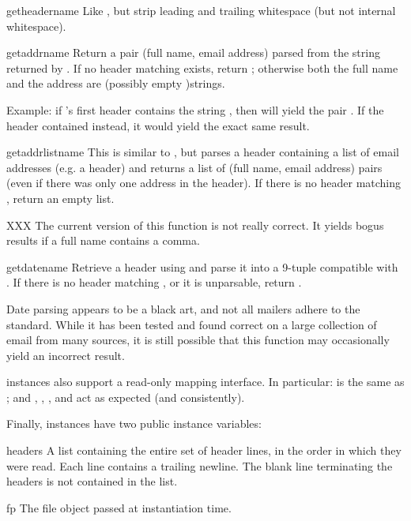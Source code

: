 \begin{funcdesc}{getheader}{name}
Like , but strip leading and trailing
whitespace (but not internal whitespace).
\end{funcdesc}

\begin{funcdesc}{getaddr}{name}
Return a pair (full name, email address) parsed from the string
returned by .  If no header matching
 exists, return ; otherwise both the full
name and the address are (possibly empty )strings.

Example: if 's first  header contains the string
, then
 will yield the pair
.
If the header contained
 instead, it would yield the
exact same result.
\end{funcdesc}

\begin{funcdesc}{getaddrlist}{name}
This is similar to , but parses a header
containing a list of email addresses (e.g. a  header) and
returns a list of (full name, email address) pairs (even if there was
only one address in the header).  If there is no header matching
, return an empty list.

XXX The current version of this function is not really correct.  It
yields bogus results if a full name contains a comma.
\end{funcdesc}

\begin{funcdesc}{getdate}{name}
Retrieve a header using  and parse it into a 9-tuple
compatible with .  If there is no header matching
, or it is unparsable, return .

Date parsing appears to be a black art, and not all mailers adhere to
the standard.  While it has been tested and found correct on a large
collection of email from many sources, it is still possible that this
function may occasionally yield an incorrect result.
\end{funcdesc}

 instances also support a read-only mapping interface.
In particular:  is the same as ;
and , , ,
 and  act as expected (and
consistently).

Finally,  instances have two public instance variables:

\begin{datadesc}{headers}
A list containing the entire set of header lines, in the order in
which they were read.  Each line contains a trailing newline.  The
blank line terminating the headers is not contained in the list.
\end{datadesc}

\begin{datadesc}{fp}
The file object passed at instantiation time.
\end{datadesc}
